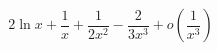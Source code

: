 \begin{displaymath}
 2\ln x + \dfrac{1}{x} + \dfrac{1}{2x^2} - \dfrac{2}{3x^3} + o\left( \dfrac{1}{x^3}\right) 
\end{displaymath}
